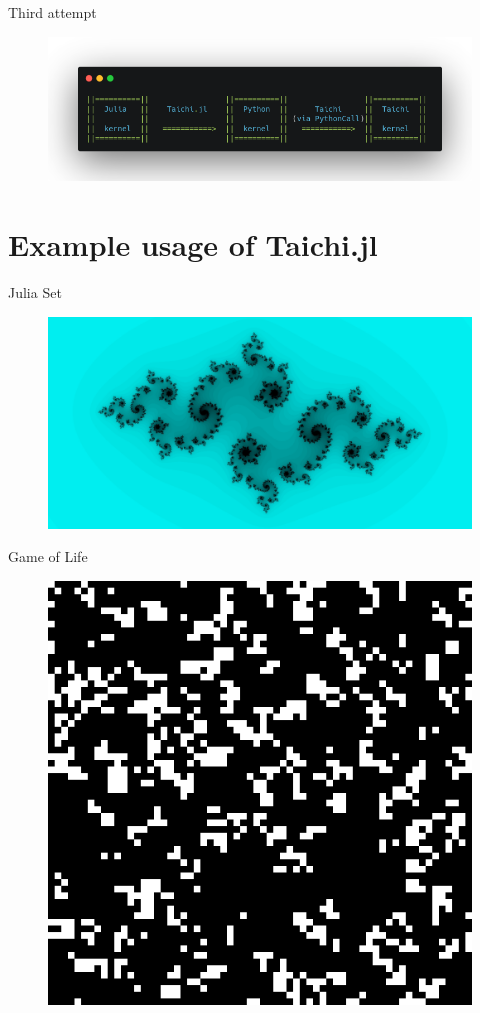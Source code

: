 \documentclass{beamer}
\begin{document}
\begin{frame}[allowframebreaks]{Third attempt}
    \begin{figure}[htpb]
        \begin{center}
            \includegraphics[width=.8\linewidth]{pic/code_07.png}
        \end{center}
    \end{figure}
\end{frame}

\section{Example usage of Taichi.jl}
\begin{frame}{Julia Set}
    \begin{figure}[htpb]
        \begin{center}
            \includegraphics[width=.8\linewidth]{pic/juliaset.png}
        \end{center}
    \end{figure}
\end{frame}

\begin{frame}{Game of Life}
    \begin{figure}[htpb]
        \begin{center}
            \includegraphics[width=.6\linewidth]{pic/gameoflife.png}
        \end{center}
    \end{figure}
\end{frame}
\end{document}
